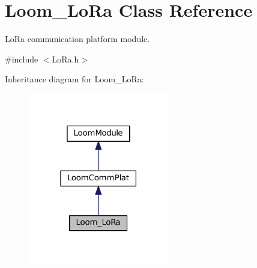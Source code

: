 \hypertarget{class_loom___lo_ra}{}\section{Loom\+\_\+\+Lo\+Ra Class Reference}
\label{class_loom___lo_ra}


Lo\+Ra communication platform module.  




{\ttfamily \#include $<$Lo\+Ra.\+h$>$}



Inheritance diagram for Loom\+\_\+\+Lo\+Ra\+:\nopagebreak
\begin{figure}[H]
\begin{center}
\leavevmode
\includegraphics[width=174pt]{class_loom___lo_ra__inherit__graph}
\end{center}
\end{figure}
